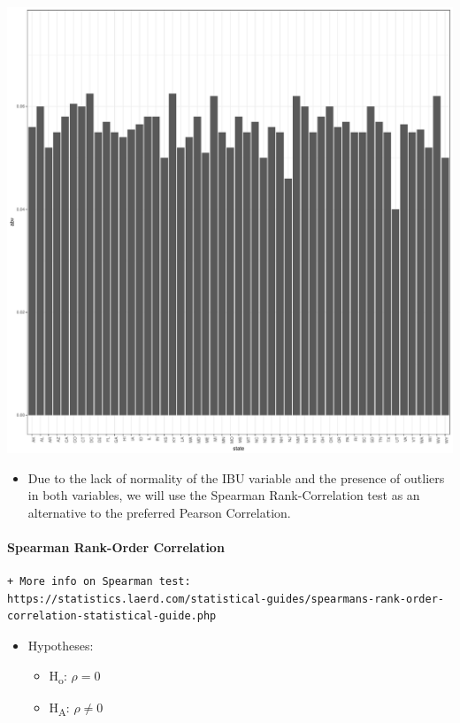 \documentclass[]{article}
\providecommand{\tightlist}{%
  \setlength{\itemsep}{0pt}\setlength{\parskip}{0pt}}
\let\oldparagraph\paragraph
\renewcommand{\paragraph}[1]{\oldparagraph{#1}\mbox{}}
\begin{document}
\includegraphics{Analysis_Final_files/figure-latex/unnamed-chunk-17-1.pdf}

\begin{itemize}
\tightlist
\item
  Due to the lack of normality of the IBU variable and the presence of
  outliers in both variables, we will use the Spearman Rank-Correlation
  test as an alternative to the preferred Pearson Correlation.
\end{itemize}

\paragraph{Spearman Rank-Order
Correlation}\label{spearman-rank-order-correlation}

\begin{verbatim}
+ More info on Spearman test: https://statistics.laerd.com/statistical-guides/spearmans-rank-order-correlation-statistical-guide.php
\end{verbatim}

\begin{itemize}
\tightlist
\item
  Hypotheses:

  \begin{itemize}
  \tightlist
  \item
    H\textsubscript{o}: \(\rho = 0\)
  \item
    H\textsubscript{A}: \(\rho \neq 0\)
  \end{itemize}
\end{itemize}
\end{document}
